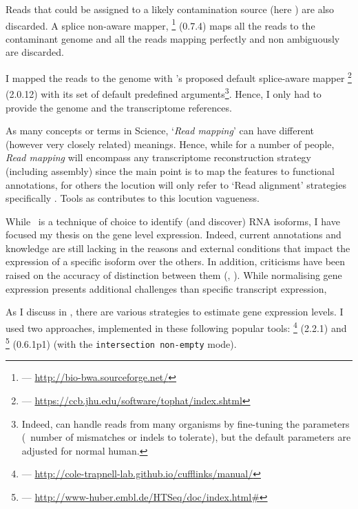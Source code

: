 Reads that could be assigned to a likely contamination source (here
) are also discarded. A splice non-aware mapper,
\footnote{ --- \href{http://bio-bwa.sourceforge.net/}%
{http://bio-bwa.sourceforge.net/}} (0.7.4) maps all the reads to the contaminant
genome and all the reads mapping perfectly and non ambiguously are discarded.

I mapped the reads to the genome with \irap's proposed default splice-aware mapper
\footnote{ ---
\href{https://ccb.jhu.edu/software/tophat/index.shtml}%
{https://ccb.jhu.edu/software/tophat/index.shtml}} (2.0.12) 
with its set of default predefined arguments\footnote{Indeed,  can
handle reads from many organisms by fine-tuning the parameters (\eg\ number
of mismatches or indels to tolerate), but the default parameters are adjusted
for normal human.}. Hence, I only had to provide the
genome and the transcriptome references.

\NB As many concepts or terms in Science,
`\emph{Read mapping}' can have different (however very closely related) meanings.
Hence, while for a number of people, \emph{Read mapping} will encompass any
transcriptome reconstruction strategy (including  assembly) since
the main point is to map the features to functional annotations, for others the
locution will only refer to `Read alignment' strategies specifically
. Tools as  contributes to this
locution vagueness.

While \Rnaseq\ is a technique of choice to identify (and discover) \gls{RNA}
isoforms, I have focused my thesis on the gene level expression. Indeed, current
annotations and knowledge are still lacking in the reasons and
external conditions that impact the expression of a specific isoform over the
others. In addition, criticisms have been raised on the accuracy of distinction
between them (\cite{tamaraRNA}, \cite{ernestRNA}). While normalising gene
expression presents additional challenges than specific transcript expression,


As I discuss in , there are various strategies to estimate
gene expression levels. I used two approaches, implemented in these
following popular tools:
\footnote{ ---
\href{http://cole-trapnell-lab.github.io/cufflinks/manual/}%
{http://cole-trapnell-lab.github.io/cufflinks/manual/}} (2.2.1) 
and \footnote{ ---
\href{http://www-huber.embl.de/HTSeq/doc/index.html\#}%
{http://www-huber.embl.de/HTSeq/doc/index.html\#}} (0.6.1p1) 
(with the \texttt{intersection non-empty} mode).


